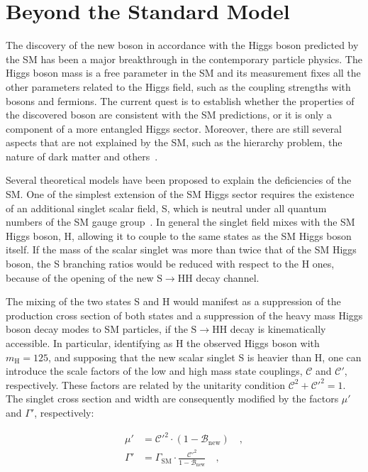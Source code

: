 \section{Beyond the Standard Model}
\label{sec:BSM}

The discovery of the new boson in accordance with the Higgs boson predicted by the SM has been a major breakthrough in the contemporary particle physics. The Higgs boson mass is a free parameter in the SM and its measurement fixes all the other parameters related to the Higgs field, such as the coupling strengths with bosons and fermions. The current quest is to establish whether the properties of the discovered boson are consistent with the SM predictions, or it is only a component of a more entangled Higgs sector. Moreover, there are still several aspects that are not explained by the SM, such as the hierarchy problem, the nature of dark matter and others~\cite{Langacker:2010zza}.

Several theoretical models have been proposed to explain the deficiencies of the SM. One of the simplest extension of the SM Higgs sector requires the existence of an additional singlet scalar field, S, which is neutral under all quantum numbers of the SM gauge group~\cite{Robens:2015gla}. In general the singlet field mixes with the SM Higgs boson, H, allowing it to couple to the same states as the SM Higgs boson itself. If the mass of the scalar singlet was more than twice that of the SM Higgs boson, the S branching ratios would be reduced with respect to the H ones, because of the opening of the new $\mathrm{S \to HH}$ decay channel.

The mixing of the two states S and H would manifest as a suppression of the production cross section of both states and a suppression of the heavy mass Higgs boson decay modes to SM particles, if the $\mathrm{S \to HH}$ decay is kinematically accessible. In particular, identifying as H the observed Higgs boson with $m_\mathrm{H} = 125$\GeV, and supposing that the new scalar singlet S is heavier than H, one can introduce the scale factors of the low and high mass state couplings, $\mathcal{C}$ and $\mathcal{C'}$, respectively. These factors are related by the unitarity condition $\mathcal{C}^2 + \mathcal{C'}^2 = 1$. The singlet cross section and width are consequently modified by the factors $\mu'$ and $\Gamma'$, respectively:

\begin{equation}
\begin{split}
\mu' &= \mathcal{C'}^2 \cdot (1 - \mathcal{B}_\mathrm{new}) \quad ,\\
\Gamma' &= \Gamma_\mathrm{SM} \cdot \frac{\mathcal{C'}^2}{1 - \mathcal{B}_\mathrm{new}} \quad ,
\end{split}
\end{equation}

